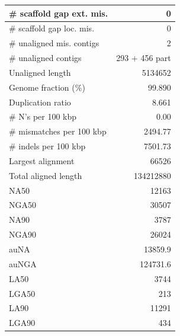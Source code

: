 \documentclass[12pt,a4paper]{article}
\begin{document}
\begin{table}[ht]
\begin{center}
\begin{tabular}{|l*{1}{|r}|}
\# scaffold gap ext. mis. & 0 \\ \hline
\# scaffold gap loc. mis. & 0 \\ \hline
\# unaligned mis. contigs & 2 \\ \hline
\# unaligned contigs & 293 + 456 part \\ \hline
Unaligned length & 5134652 \\ \hline
Genome fraction (\%) & 99.890 \\ \hline
Duplication ratio & 8.661 \\ \hline
\# N's per 100 kbp & 0.00 \\ \hline
\# mismatches per 100 kbp & 2494.77 \\ \hline
\# indels per 100 kbp & 7501.73 \\ \hline
Largest alignment & 66526 \\ \hline
Total aligned length & 134212880 \\ \hline
NA50 & 12163 \\ \hline
NGA50 & 30507 \\ \hline
NA90 & 3787 \\ \hline
NGA90 & 26024 \\ \hline
auNA & 13859.9 \\ \hline
auNGA & 124731.6 \\ \hline
LA50 & 3744 \\ \hline
LGA50 & 213 \\ \hline
LA90 & 11291 \\ \hline
LGA90 & 434 \\ \hline
\end{tabular}
\end{center}
\end{table}
\end{document}
